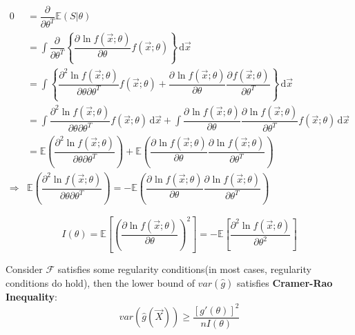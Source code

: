 \begin{enumerate}[topsep=2pt,itemsep=0pt]
\begin{itemize}
{\begin{align}
                0&=\dfrac{\partial^{} }{\partial \theta ^{T}}\mathbb{E}(S|\theta  )\\
                &=\int\dfrac{\partial^{} }{\partial \theta ^{T}} \left\{\dfrac{\partial^{} \ln f(\vec{x};\theta ) }{\partial \theta ^{}}  f(\vec{x};\theta )\right\}\,\mathrm{d}\vec{x}\\
                &=\int \left\{ \dfrac{\partial^{2} \ln  f(\vec{x};\theta )}{\partial \theta \partial \theta ^{T}} f(\vec{x};\theta )+\dfrac{\partial^{} \ln f(\vec{x};\theta )}{\partial \theta ^{}}   \dfrac{\partial^{}  f(\vec{x};\theta )}{\partial \theta ^{T}} \right\} \,\mathrm{d}\vec{x} \\
                &=\int  \dfrac{\partial^{2} \ln  f(\vec{x};\theta )}{\partial \theta \partial \theta ^{T}} f(\vec{x};\theta ) \,\mathrm{d}\vec{x}  +\int \dfrac{\partial^{} \ln  f(\vec{x};\theta )}{\partial \theta ^{}} \dfrac{\partial^{} \ln f(\vec{x};\theta )}{\partial \theta^{T}} f(\vec{x};\theta )\,\mathrm{d}   \vec{x}\\
                &=\mathbb{E}\left( \dfrac{\partial^{2} \ln f(\vec{x};\theta )}{\partial \theta \partial \theta ^{T}}\right)+\mathbb{E}\left( \dfrac{\partial^{} \ln f(\vec{x};\theta )}{\partial \theta ^{}} \dfrac{\partial^{} \ln f(\vec{x};\theta )}{\partial \theta ^{T}} \right)\\
                \Rightarrow & \mathbb{E}\left( \dfrac{\partial^{2} \ln f(\vec{x};\theta )}{\partial \theta \partial \theta ^{T}}\right)=-\mathbb{E}\left( \dfrac{\partial^{} \ln f(\vec{x};\theta )}{\partial \theta ^{}} \dfrac{\partial^{} \ln f(\vec{x};\theta )}{\partial \theta ^{T}} \right)
            \end{align}
            
            }
            \begin{equation}\label{EqaFisherInformation}
                I(\theta)=\mathbb{E}\left[\left(\frac{\partial \ln f(\vec{x};\theta)}{\partial\theta}\right)^2\right]=-\mathbb{E}\left[\frac{\partial^2\ln f(\vec{x};\theta)}{\partial \theta^2}\right]
            \end{equation}
        \end{itemize}

        Consider $\mathscr{F}$ satisfies some regularity conditions(in most cases, regularity conditions do  hold), then the lower bound of $var(\hat{g})$ satisfies \textbf{Cramer-Rao Inequality}:
        \begin{equation}
            var(\hat{g}(\vec{X}))\geq\frac{[g'(\theta)]^2}{nI(\theta)}
        \end{equation}


\end{enumerate}
